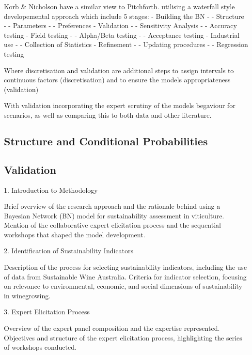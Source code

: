 Korb & Nicholson have a similar view to Pitchforth. utilising a waterfall style developemental approach which include 5 stages:
- Building the BN
-       - Structure
-       - Parameters
-       - Preferences
- Validation
-       - Sensitivity Analysis
-       - Accuracy testing
- Field testing
-       - Alpha/Beta testing
-       - Acceptance testing
- Industrial use
-       - Collection of Statistics
- Refinement
-       - Updating procedures
-       - Regression testing

Where discretisation and validation are additional steps to assign intervals to continuous factors (discretisation) and to ensure the models appropriateness (validation)

With validation incorporating the expert scrutiny of the models begaviour for scenarios, as well as comparing this to both data and other literature.

\subsection{Structure and Conditional Probabilities}

\subsection{Validation}

\citep{korbBayesianArtificialIntelligence2011}





1. Introduction to Methodology

    Brief overview of the research approach and the rationale behind using a Bayesian Network (BN) model for sustainability assessment in viticulture.
    Mention of the collaborative expert elicitation process and the sequential workshops that shaped the model development.

2. Identification of Sustainability Indicators

    Description of the process for selecting sustainability indicators, including the use of data from Sustainable Wine Australia.
    Criteria for indicator selection, focusing on relevance to environmental, economic, and social dimensions of sustainability in winegrowing.

3. Expert Elicitation Process

    Overview of the expert panel composition and the expertise represented.
    Objectives and structure of the expert elicitation process, highlighting the series of workshops conducted.

